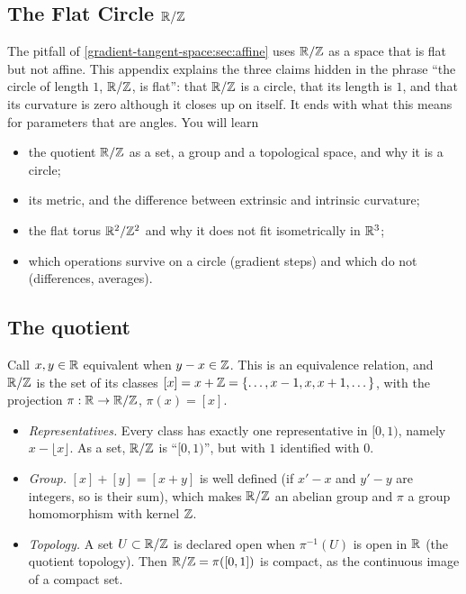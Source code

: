 \begin{notechapter}
\chapter{The Flat Circle \texorpdfstring{$\mathbb{R}/\mathbb{Z}$}{R/Z}}\label{ch:flat-circle}

\begin{chapterintro}
The pitfall of \cref{gradient-tangent-space:sec:affine} uses $\mathbb{R}/\mathbb{Z}$ as a space that is flat but
not affine. This appendix explains the three claims hidden in the phrase ``the circle of length $1$,
$\mathbb{R}/\mathbb{Z}$, is flat'': that $\mathbb{R}/\mathbb{Z}$ is a circle, that its length is $1$, and that its curvature is zero
although it closes up on itself. It ends with what this means for parameters that are angles. You will learn
\begin{itemize}[nosep]
  \item the quotient $\mathbb{R}/\mathbb{Z}$ as a set, a group and a topological space, and why it is a circle;
  \item its metric, and the difference between extrinsic and intrinsic curvature;
  \item the flat torus $\mathbb{R}^2/\mathbb{Z}^2$ and why it does not fit isometrically in $\mathbb{R}^3$;
  \item which operations survive on a circle (gradient steps) and which do not (differences, averages).
\end{itemize}
\end{chapterintro}

\section{The quotient}

Call $x, y\in\mathbb{R}$ equivalent when $y - x\in\mathbb{Z}$. This is an equivalence relation, and $\mathbb{R}/\mathbb{Z}$ is the set of
its classes $[x] = x + \mathbb{Z} = \{\dots, x - 1, x, x + 1, \dots\}$, with the projection $\pi:\mathbb{R}\to\mathbb{R}/\mathbb{Z}$, $\pi(x) = [x]$.
\begin{itemize}[nosep]
  \item \emph{Representatives.} Every class has exactly one representative in $[0, 1)$, namely
        $x - \lfloor x\rfloor$. As a set, $\mathbb{R}/\mathbb{Z}$ is ``$[0, 1)$'', but with $1$ identified with $0$.
  \item \emph{Group.} $[x] + [y] = [x + y]$ is well defined (if $x' - x$ and $y' - y$ are integers, so is their
        sum), which makes $\mathbb{R}/\mathbb{Z}$ an abelian group and $\pi$ a group homomorphism with kernel $\mathbb{Z}$.
  \item \emph{Topology.} A set $U\subset\mathbb{R}/\mathbb{Z}$ is declared open when $\pi^{-1}(U)$ is open in $\mathbb{R}$ (the quotient
        topology). Then $\mathbb{R}/\mathbb{Z} = \pi([0, 1])$ is compact, as the continuous image of a compact set.
\end{itemize}


\end{notechapter}
